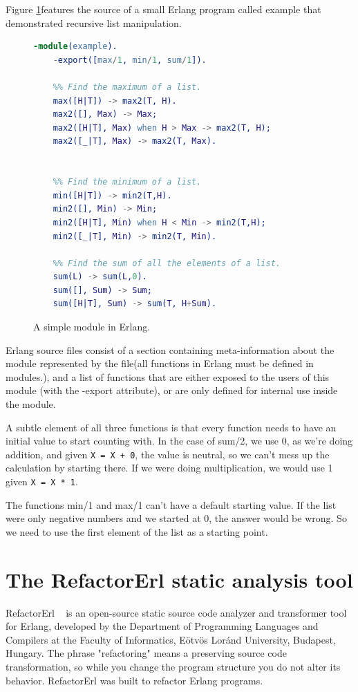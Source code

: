 Figure \ref{fig:example_erlang}features the source of a small Erlang program
called example that demonstrated recursive list manipulation.
\begin{figure}[ht]
	\begin{lstlisting}[extendedchars=true, language=Erlang, basicstyle=\footnotesize\ttfamily, keywordstyle=\color{red}]
	-module(example). 
	-export([max/1, min/1, sum/1]).
	
	%% Find the maximum of a list.
	max([H|T]) -> max2(T, H).
	max2([], Max) -> Max;
	max2([H|T], Max) when H > Max -> max2(T, H);
	max2([_|T], Max) -> max2(T, Max).
	

	%% Find the minimum of a list.
	min([H|T]) -> min2(T,H).
	min2([], Min) -> Min;
	min2([H|T], Min) when H < Min -> min2(T,H);
	min2([_|T], Min) -> min2(T, Min).
	
	%% Find the sum of all the elements of a list.
	sum(L) -> sum(L,0).
	sum([], Sum) -> Sum;
	sum([H|T], Sum) -> sum(T, H+Sum).
	\end{lstlisting}
\caption{A simple module in Erlang.}
\label{fig:example_erlang}
\end{figure}

Erlang source files consist of a section containing meta-information about the module represented by the file(all functions in Erlang must be defined in
modules.), and a list of functions that are either exposed to the users of this module (with the -export attribute), or are only defined for internal use inside the module.  

A subtle element of all three functions is that every function needs to have an initial value to start counting with. In the case of sum/2, we use 0, as we’re doing addition, and given \texttt{X = X + 0}, the value is neutral, so we can’t mess up the calculation by starting there. If we were doing multiplication, we would use 1 given \texttt{X = X * 1}. 

The functions min/1 and max/1 can’t have a default starting value. If the list were only negative numbers and we started at 0, the answer would be wrong. So we need to use the first element of the list as a starting point.

\section{The RefactorErl static analysis tool} 

RefactorErl ~\cite{refactorerl1, refactorerl2} is an open-source static source code analyzer and transformer tool for Erlang, developed by the Department of Programming Languages and Compilers at the Faculty of Informatics, Eötvös Loránd University, Budapest, Hungary. The phrase "refactoring" means a preserving source code transformation, so while you change the program structure you do not alter its behavior. RefactorErl was built to refactor Erlang programs.

